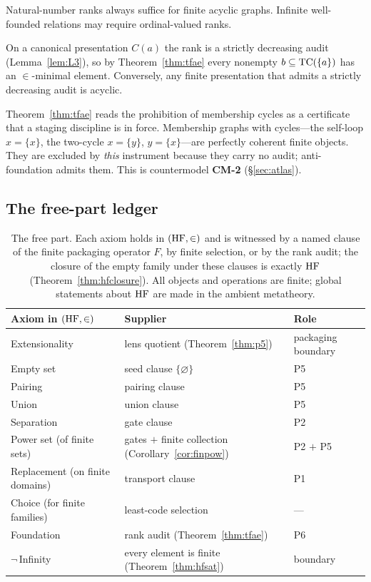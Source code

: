 \noindent Natural-number ranks always suffice for finite acyclic graphs. Infinite well-founded
relations may require ordinal-valued ranks.

\begin{corollary}[\inhouse]\label{cor:foundation}
On a canonical presentation $C(a)$ the rank is a strictly decreasing audit (Lemma~\ref{lem:L3}),
so by Theorem~\ref{thm:tfae} every nonempty $b\subseteq\operatorname{TC}(\{a\})$ has an $\in$-minimal element.
Conversely, any finite presentation that admits a strictly decreasing audit is acyclic.
\end{corollary}

\begin{remark}\label{rem:foundation}
Theorem~\ref{thm:tfae} reads the prohibition of membership cycles as a certificate that a
staging discipline is in force. Membership graphs with cycles---the self-loop $x=\{x\}$, the
two-cycle $x=\{y\}$, $y=\{x\}$---are perfectly coherent finite objects. They are excluded by
\emph{this} instrument because they carry no audit; anti-foundation \citep{Aczel1988} admits them.
This is countermodel \textbf{CM-2} (\S\ref{sec:atlas}).
\end{remark}

\subsection{The free-part ledger}

\begin{table}[tbp]\centering
\small
\begin{tabular}{@{}lll@{}}
\toprule
Axiom in $(\mathrm{HF},\in)$ & Supplier & Role \\
\midrule
Extensionality & lens quotient (Theorem~\ref{thm:p5}) & packaging boundary \\
Empty set & seed clause $\{\varnothing\}$ & P5 \\
Pairing & pairing clause & P5 \\
Union & union clause & P5 \\
Separation & gate clause & P2 \\
Power set (of finite sets) & gates $+$ finite collection (Corollary~\ref{cor:finpow}) & P2 $+$ P5 \\
Replacement (on finite domains) & transport clause & P1 \\
Choice (for finite families) & least-code selection & --- \\
Foundation & rank audit (Theorem~\ref{thm:tfae}) & P6 \\
$\neg\,$Infinity & every element is finite (Theorem~\ref{thm:hfsat}) & boundary \\
\bottomrule
\end{tabular}
\caption{The free part. Each axiom holds in $(\mathrm{HF},\in)$ and is witnessed by a named clause of the
finite packaging operator $F$, by finite selection, or by the rank audit; the closure of the
empty family under these clauses is exactly $\mathrm{HF}$ (Theorem~\ref{thm:hfclosure}). All objects and
operations are finite; global statements about $\mathrm{HF}$ are made in the ambient metatheory.}
\label{tab:freepart}
\end{table}

